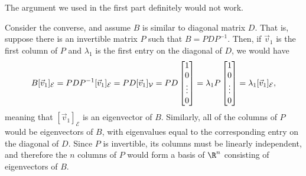 \documentclass{problemset}
\begin{document}
\begin{parts}
\begin{solution}
				The argument we used in the first part definitely would not work.

				Consider the converse, and assume $B$ is similar to diagonal 
				matrix $D$. That is, suppose there is an invertible matrix 
				$P$ such that $B=PDP^{-1}$. Then, if $\vec v_1$ is the first 
				column of $P$ and $\lambda_1$ is the first entry on	the diagonal
				of $D$, we would have
				\[
					B[\vec v_1]_{\mathcal E}
					=PDP^{-1}[\vec v_1]_{\mathcal E}
					=PD[\vec v_1]_{\mathcal V}
					=PD\begin{bmatrix}1\\0\\\vdots\\0\end{bmatrix}
					=\lambda_1P\begin{bmatrix}1\\0\\\vdots\\0\end{bmatrix}
					=\lambda_1[\vec v_1]_{\mathcal E},
				\]
				meaning that $[\vec v_1]_{\mathcal E}$ is an eigenvector of $B$. Similarly, all
				of the columns of $P$ would be eigenvectors of $B$, with eigenvalues
				equal to the corresponding entry on the diagonal of $D$. Since $P$ is 
				invertible, its columns must be linearly independent, and therefore
				the $n$ columns of $P$ would form a basis of $\R^n$ consisting of
				eigenvectors of $B$. 
			\end{solution}
	\end{parts}
\end{document}
